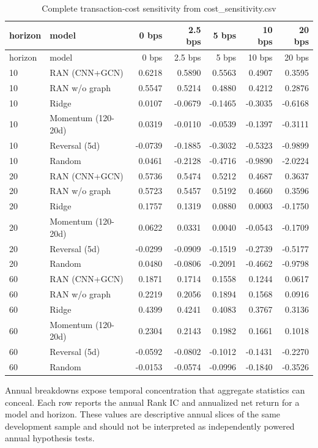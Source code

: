 \documentclass[10pt]{article}
\begin{document}
\begingroup\scriptsize\setlength{\tabcolsep}{3pt}
\begin{longtable}{llrrrrr}
\caption{Complete transaction-cost sensitivity from cost\_sensitivity.csv}\label{tab:costall}\\
\toprule
horizon & model & 0 bps & 2.5 bps & 5 bps & 10 bps & 20 bps \\
\midrule
\endfirsthead
\toprule
horizon & model & 0 bps & 2.5 bps & 5 bps & 10 bps & 20 bps \\
\midrule
\endhead
10 & RAN (CNN+GCN) & 0.6218 & 0.5890 & 0.5563 & 0.4907 & 0.3595 \\
10 & RAN w/o graph & 0.5547 & 0.5214 & 0.4880 & 0.4212 & 0.2876 \\
10 & Ridge & 0.0107 & -0.0679 & -0.1465 & -0.3035 & -0.6168 \\
10 & Momentum (120-20d) & 0.0319 & -0.0110 & -0.0539 & -0.1397 & -0.3111 \\
10 & Reversal (5d) & -0.0739 & -0.1885 & -0.3032 & -0.5323 & -0.9899 \\
10 & Random & 0.0461 & -0.2128 & -0.4716 & -0.9890 & -2.0224 \\
20 & RAN (CNN+GCN) & 0.5736 & 0.5474 & 0.5212 & 0.4687 & 0.3637 \\
20 & RAN w/o graph & 0.5723 & 0.5457 & 0.5192 & 0.4660 & 0.3596 \\
20 & Ridge & 0.1757 & 0.1319 & 0.0880 & 0.0003 & -0.1750 \\
20 & Momentum (120-20d) & 0.0622 & 0.0331 & 0.0040 & -0.0543 & -0.1709 \\
20 & Reversal (5d) & -0.0299 & -0.0909 & -0.1519 & -0.2739 & -0.5177 \\
20 & Random & 0.0480 & -0.0806 & -0.2091 & -0.4662 & -0.9798 \\
60 & RAN (CNN+GCN) & 0.1871 & 0.1714 & 0.1558 & 0.1244 & 0.0617 \\
60 & RAN w/o graph & 0.2219 & 0.2056 & 0.1894 & 0.1568 & 0.0916 \\
60 & Ridge & 0.4399 & 0.4241 & 0.4083 & 0.3767 & 0.3136 \\
60 & Momentum (120-20d) & 0.2304 & 0.2143 & 0.1982 & 0.1661 & 0.1018 \\
60 & Reversal (5d) & -0.0592 & -0.0802 & -0.1012 & -0.1431 & -0.2270 \\
60 & Random & -0.0153 & -0.0574 & -0.0996 & -0.1840 & -0.3526 \\
\bottomrule
\end{longtable}
\endgroup

Annual breakdowns expose temporal concentration that aggregate statistics can conceal. Each row reports the annual Rank IC and annualized net return for a model and horizon. These values are descriptive annual slices of the same development sample and should not be interpreted as independently powered annual hypothesis tests.
\end{document}
